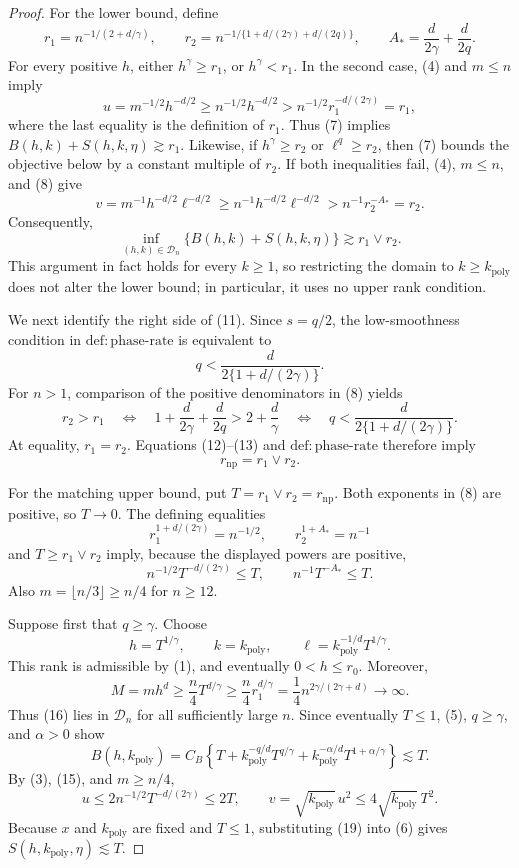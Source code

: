 \documentclass{article}
\begin{document}
\begin{proof}
For the lower bound, define
\[
 r_1=n^{-1/(2+d/\gamma)},
 \qquad
 r_2=n^{-1/\{1+d/(2\gamma)+d/(2q)\}},
 \qquad
 A_* = \frac d{2\gamma}+\frac d{2q}.
 \tag{8}
\]
For every positive \(h\), either \(h^\gamma\ge r_1\), or \(h^\gamma<r_1\).  In the second case, (4) and \(m\le n\) imply
\[
 u=m^{-1/2}h^{-d/2}
 \ge n^{-1/2}h^{-d/2}
 >n^{-1/2}r_1^{-d/(2\gamma)}=r_1,
 \tag{9}
\]
where the last equality is the definition of \(r_1\).  Thus (7) implies \(B(h,k)+S(h,k,\eta)\gtrsim r_1\).  Likewise, if \(h^\gamma\ge r_2\) or \(\ell^q\ge r_2\), then (7) bounds the objective below by a constant multiple of \(r_2\).  If both inequalities fail, (4), \(m\le n\), and (8) give
\[
 v=m^{-1}h^{-d/2}\ell^{-d/2}
 \ge n^{-1}h^{-d/2}\ell^{-d/2}
 >n^{-1}r_2^{-A_*}=r_2.
 \tag{10}
\]
Consequently,
\[
 \inf_{(h,k)\in\mathcal D_n}\{B(h,k)+S(h,k,\eta)\}
 \gtrsim r_1\vee r_2.
 \tag{11}
\]
This argument in fact holds for every \(k\ge1\), so restricting the domain to \(k\ge k_{\mathrm{poly}}\) does not alter the lower bound; in particular, it uses no upper rank condition.

We next identify the right side of (11).  Since \(s=q/2\), the low-smoothness condition in \(\mathrm{def{:}phase\text{-}rate}\) is equivalent to
\[
 q<\frac{d}{2\{1+d/(2\gamma)\}}.
 \tag{12}
\]
For \(n>1\), comparison of the positive denominators in (8) yields
\[
 r_2>r_1
 \quad\Longleftrightarrow\quad
 1+\frac d{2\gamma}+\frac d{2q}>2+\frac d\gamma
 \quad\Longleftrightarrow\quad
 q<\frac{d}{2\{1+d/(2\gamma)\}}.
 \tag{13}
\]
At equality, \(r_1=r_2\).  Equations (12)--(13) and \(\mathrm{def{:}phase\text{-}rate}\) therefore imply
\[
 r_{\mathrm{np}}=r_1\vee r_2.
 \tag{14}
\]

For the matching upper bound, put \(T=r_1\vee r_2=r_{\mathrm{np}}\).  Both exponents in (8) are positive, so \(T\to0\).  The defining equalities
\[
 r_1^{1+d/(2\gamma)}=n^{-1/2},
 \qquad
 r_2^{1+A_*}=n^{-1}
\]
and \(T\ge r_1\vee r_2\) imply, because the displayed powers are positive,
\[
 n^{-1/2}T^{-d/(2\gamma)}\le T,
 \qquad
 n^{-1}T^{-A_*}\le T.
 \tag{15}
\]
Also \(m=\lfloor n/3\rfloor\ge n/4\) for \(n\ge12\).

Suppose first that \(q\ge\gamma\).  Choose
\[
 h=T^{1/\gamma},\qquad k=k_{\mathrm{poly}},\qquad
 \ell=k_{\mathrm{poly}}^{-1/d}T^{1/\gamma}.
 \tag{16}
\]
This rank is admissible by (1), and eventually \(0<h\le r_0\).  Moreover,
\[
 M=m h^d
 \ge\frac n4 T^{d/\gamma}
 \ge\frac n4 r_1^{d/\gamma}
 =\frac14 n^{2\gamma/(2\gamma+d)}\longrightarrow\infty.
 \tag{17}
\]
Thus (16) lies in \(\mathcal D_n\) for all sufficiently large \(n\).  Since eventually \(T\le1\), (5), \(q\ge\gamma\), and \(\alpha>0\) show
\[
 B(h,k_{\mathrm{poly}})
 =C_B\left\{T+k_{\mathrm{poly}}^{-q/d}T^{q/\gamma}
 +k_{\mathrm{poly}}^{-\alpha/d}T^{1+\alpha/\gamma}\right\}
 \lesssim T.
 \tag{18}
\]
By (3), (15), and \(m\ge n/4\),
\[
 u\le2n^{-1/2}T^{-d/(2\gamma)}\le2T,
 \qquad
 v=\sqrt{k_{\mathrm{poly}}}\,u^2\le4\sqrt{k_{\mathrm{poly}}}\,T^2.
 \tag{19}
\]
Because \(x\) and \(k_{\mathrm{poly}}\) are fixed and \(T\le1\), substituting (19) into (6) gives \(S(h,k_{\mathrm{poly}},\eta)\lesssim T\).


\end{proof}
\end{document}
